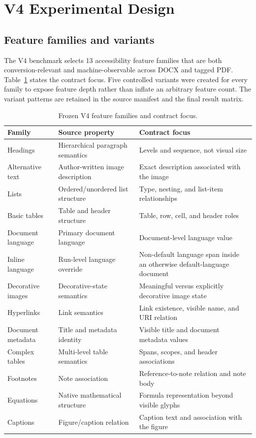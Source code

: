 \section{V4 Experimental Design}
\label{sec:design}

\subsection{Feature families and variants}
The V4 benchmark selects 13 accessibility feature families that are both conversion-relevant and machine-observable across DOCX and tagged PDF. Table~\ref{tab:families} states the contract focus. Five controlled variants were created for every family to expose feature depth rather than inflate an arbitrary feature count. The variant patterns are retained in the source manifest and the final result matrix.

\begin{table}[t]
\centering\scriptsize
\caption{Frozen V4 feature families and contract focus.}
\label{tab:families}
\begin{tabular}{p{}p{}p{}}
\toprule
Family & Source property & Contract focus \\
\midrule
Headings & Hierarchical paragraph semantics & Levels and sequence, not visual size \\
Alternative text & Author-written image description & Exact description associated with the image \\
Lists & Ordered/unordered list structure & Type, nesting, and list-item relationships \\
Basic tables & Table and header structure & Table, row, cell, and header roles \\
Document language & Primary document language & Document-level language value \\
Inline language & Run-level language override & Non-default language span inside an otherwise default-language document \\
Decorative images & Decorative-state semantics & Meaningful versus explicitly decorative image state \\
Hyperlinks & Link semantics & Link existence, visible name, and URI relation \\
Document metadata & Title and metadata identity & Visible title and document metadata values \\
Complex tables & Multi-level table semantics & Spans, scopes, and header associations \\
Footnotes & Note association & Reference-to-note relation and note body \\
Equations & Native mathematical structure & Formula representation beyond visible glyphs \\
Captions & Figure/caption relation & Caption text and association with the figure \\
\bottomrule
\end{tabular}
\end{table}

